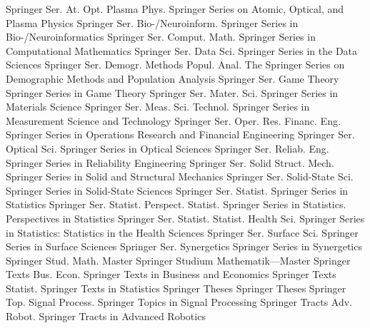 {Springer Ser. At. Opt. Plasma Phys.}
{Springer Series on Atomic, Optical, and Plasma Physics}
{Springer Ser. Bio-/Neuroinform.}
{Springer Series in Bio-/Neuroinformatics}
{Springer Ser. Comput. Math.}
{Springer Series in Computational Mathematics}
{Springer Ser. Data Sci.}
{Springer Series in the Data Sciences}
{Springer Ser. Demogr. Methods Popul. Anal.}
{The Springer Series on Demographic Methods and Population Analysis}
{Springer Ser. Game Theory}
{Springer Series in Game Theory}
{Springer Ser. Mater. Sci.}
{Springer Series in Materials Science}
{Springer Ser. Meas. Sci. Technol.}
{Springer Series in Measurement Science and Technology}
{Springer Ser. Oper. Res. Financ. Eng.}
{Springer Series in Operations Research and Financial Engineering}
{Springer Ser. Optical Sci.}
{Springer Series in Optical Sciences}
{Springer Ser. Reliab. Eng.}
{Springer Series in Reliability Engineering}
{Springer Ser. Solid Struct. Mech.}
{Springer Series in Solid and Structural Mechanics}
{Springer Ser. Solid-State Sci.}
{Springer Series in Solid-State Sciences}
{Springer Ser. Statist.}
{Springer Series in Statistics}
{Springer Ser. Statist. Perspect. Statist.}
{Springer Series in Statistics. Perspectives in Statistics}
{Springer Ser. Statist. Statist. Health Sci.}
{Springer Series in Statistics: Statistics in the Health Sciences}
{Springer Ser. Surface Sci.}
{Springer Series in Surface Sciences}
{Springer Ser. Synergetics}
{Springer Series in Synergetics}
{Springer Stud. Math. Master}
{Springer Studium Mathematik---Master}
{Springer Texts Bus. Econ.}
{Springer Texts in Business and Economics}
{Springer Texts Statist.}
{Springer Texts in Statistics}
{Springer Theses}
{Springer Theses}
{Springer Top. Signal Process.}
{Springer Topics in Signal Processing}
{Springer Tracts Adv. Robot.}
{Springer Tracts in Advanced Robotics}
